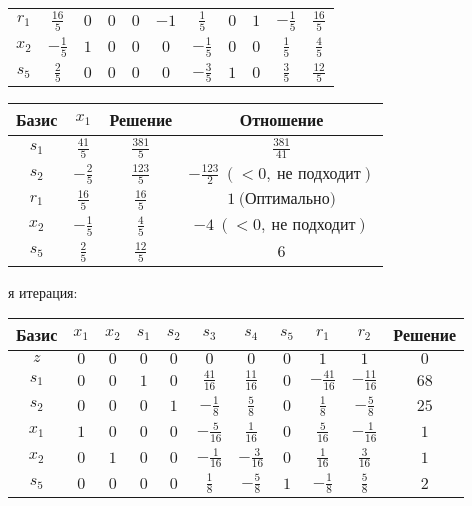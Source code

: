 \documentclass{article}%
\begin{document}
\begin{flushleft}
\begin{tabular}{|c|ccccccccc|c|}
$r_{1}$&$\frac{16}{5}$&$0$&$0$&$0$&$-1$&$\frac{1}{5}$&$0$&$1$&$-\frac{1}{5}$&$\frac{16}{5}$\\%
$x_{2}$&$-\frac{1}{5}$&$1$&$0$&$0$&$0$&$-\frac{1}{5}$&$0$&$0$&$\frac{1}{5}$&$\frac{4}{5}$\\%
$s_{5}$&$\frac{2}{5}$&$0$&$0$&$0$&$0$&$-\frac{3}{5}$&$1$&$0$&$\frac{3}{5}$&$\frac{12}{5}$\\%
\hline%
\end{tabular}%
\newline%
\newline%
\newline%
\begin{tabular}{|cccc|}%
\hline%
Базис&$x_{1}$&Решение&Отношение\\%
\hline%
$s_{1}$&$\frac{41}{5}$&$\frac{381}{5}$&$\frac{381}{41}$\\%
$s_{2}$&$-\frac{2}{5}$&$\frac{123}{5}$&$-\frac{123}{2}\: (< 0, \: \text{не подходит})$\\%
$r_{1}$&$\frac{16}{5}$&$\frac{16}{5}$&$1\: \text{(Оптимально)}$\\%
$x_{2}$&$-\frac{1}{5}$&$\frac{4}{5}$&$-4\: (< 0, \: \text{не подходит})$\\%
$s_{5}$&$\frac{2}{5}$&$\frac{12}{5}$&$6$\\%
\hline%
\end{tabular}%
\newline%
\newline%
я итерация: %
\newline%
\newline%
\renewcommand{\arraystretch}{1.3}%
\begin{tabular}{|c|ccccccccc|c|}%
\hline%
Базис&$x_{1}$&$x_{2}$&$s_{1}$&$s_{2}$&$s_{3}$&$s_{4}$&$s_{5}$&$r_{1}$&$r_{2}$&Решение\\%
\hline%
$z$&$0$&$0$&$0$&$0$&$0$&$0$&$0$&$1$&$1$&$0$\\%
\hline%
$s_{1}$&$0$&$0$&$1$&$0$&$\frac{41}{16}$&$\frac{11}{16}$&$0$&$-\frac{41}{16}$&$-\frac{11}{16}$&$68$\\%
$s_{2}$&$0$&$0$&$0$&$1$&$-\frac{1}{8}$&$\frac{5}{8}$&$0$&$\frac{1}{8}$&$-\frac{5}{8}$&$25$\\%
$x_{1}$&$1$&$0$&$0$&$0$&$-\frac{5}{16}$&$\frac{1}{16}$&$0$&$\frac{5}{16}$&$-\frac{1}{16}$&$1$\\%
$x_{2}$&$0$&$1$&$0$&$0$&$-\frac{1}{16}$&$-\frac{3}{16}$&$0$&$\frac{1}{16}$&$\frac{3}{16}$&$1$\\%
$s_{5}$&$0$&$0$&$0$&$0$&$\frac{1}{8}$&$-\frac{5}{8}$&$1$&$-\frac{1}{8}$&$\frac{5}{8}$&$2$\\%

\end{tabular}
\end{flushleft}
\end{document}

